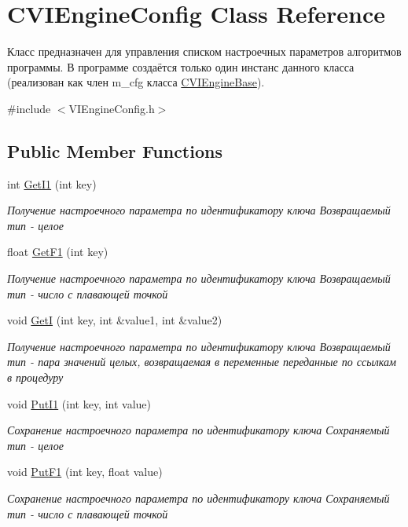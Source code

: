 \hypertarget{class_c_v_i_engine_config}{\section{C\+V\+I\+Engine\+Config Class Reference}
\label{class_c_v_i_engine_config}
}


Класс предназначен для управления списком настроечных параметров алгоритмов программы. В программе создаётся только один инстанс данного класса (реализован как член m\+\_\+cfg класса \hyperlink{class_c_v_i_engine_base}{C\+V\+I\+Engine\+Base}).  




{\ttfamily \#include $<$V\+I\+Engine\+Config.\+h$>$}

\subsection*{Public Member Functions}
\begin{DoxyCompactItemize}
\item 
int \hyperlink{class_c_v_i_engine_config_a41be84d81a153f85554171555094f20d}{Get\+I1} (int key)
\begin{DoxyCompactList}\small\item\em Получение настроечного параметра по идентификатору ключа Возвращаемый тип -\/ целое \end{DoxyCompactList}\item 
float \hyperlink{class_c_v_i_engine_config_a1f474cfcfadee9f76567fc84a10c5ad9}{Get\+F1} (int key)
\begin{DoxyCompactList}\small\item\em Получение настроечного параметра по идентификатору ключа Возвращаемый тип -\/ число с плавающей точкой \end{DoxyCompactList}\item 
void \hyperlink{class_c_v_i_engine_config_ac32483113b3f4cff0fb2dbbe2f00f420}{Get\+I} (int key, int \&value1, int \&value2)
\begin{DoxyCompactList}\small\item\em Получение настроечного параметра по идентификатору ключа Возвращаемый тип -\/ пара значений целых, возвращаемая в переменные переданные по ссылкам в процедуру \end{DoxyCompactList}\item 
void \hyperlink{class_c_v_i_engine_config_a5a4a7b7c7a9c1152998eabddf2ed020d}{Put\+I1} (int key, int value)
\begin{DoxyCompactList}\small\item\em Сохранение настроечного параметра по идентификатору ключа Сохраняемый тип -\/ целое \end{DoxyCompactList}\item 
void \hyperlink{class_c_v_i_engine_config_a6ac9297ee130cbf9b4d44bf812b3dd89}{Put\+F1} (int key, float value)
\begin{DoxyCompactList}\small\item\em Сохранение настроечного параметра по идентификатору ключа Сохраняемый тип -\/ число с плавающей точкой \end{DoxyCompactList}\end{DoxyCompactItemize}


